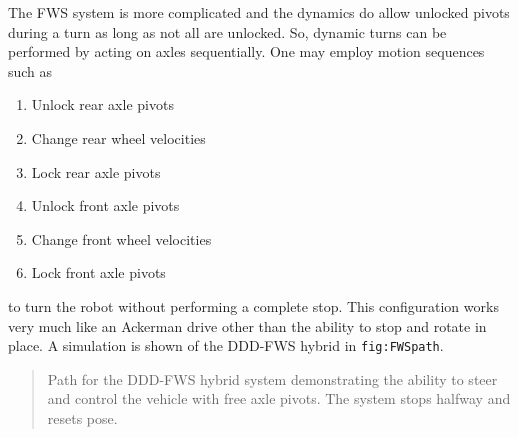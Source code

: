 The FWS system is more complicated and the dynamics do allow unlocked
pivots during a turn as long as not all are unlocked. So, dynamic turns
can be performed by acting on axles sequentially. One may employ motion
sequences such as

\begin{enumerate}
\tightlist
\item
  Unlock rear axle pivots
\item
  Change rear wheel velocities
\item
  Lock rear axle pivots
\item
  Unlock front axle pivots
\item
  Change front wheel velocities
\item
  Lock front axle pivots
\end{enumerate}

to turn the robot without performing a complete stop. This configuration
works very much like an Ackerman drive other than the ability to stop
and rotate in place. A simulation is shown of the DDD-FWS hybrid in
\texttt{fig:FWSpath}.

\begin{quote}
Path for the DDD-FWS hybrid system demonstrating the ability to steer
and control the vehicle with free axle pivots. The system stops halfway
and resets pose.
\end{quote}
